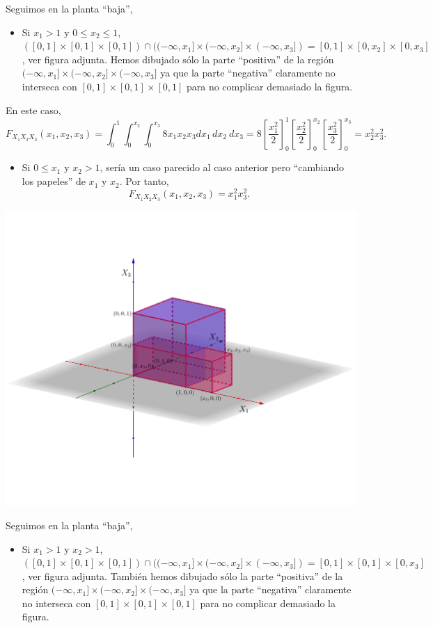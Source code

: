 \documentclass[]{book}
\providecommand{\tightlist}{%
  \setlength{\itemsep}{0pt}\setlength{\parskip}{0pt}}
\begin{document}
Seguimos en la planta ``baja'',

\begin{itemize}
\tightlist
\item
  Si \(x_1 >1\) y \(0\leq x_2\leq 1\), \(([0,1]\times [0,1]\times [0,1])\cap ((-\infty,x_1]\times (-\infty,x_2]\times (-\infty,x_3])=[0,1]\times [0,x_2]\times [0,x_3]\), ver figura adjunta. Hemos dibujado sólo la parte ``positiva'' de la región \((-\infty,x_1]\times (-\infty,x_2]\times (-\infty,x_3]\) ya que la parte ``negativa'' claramente no interseca con \([0,1]\times [0,1]\times [0,1]\) para no complicar demasiado la figura.
\end{itemize}

En este caso,
\[
F_{X_1X_2X_3}(x_1,x_2,x_3)=\int_{0}^{1}\int_{0}^{x_2}\int_{0}^{x_3} 8 x_1 x_2 x_3 dx_1\, dx_2\ dx_3 = 
8\left[\frac{x_1^2}{2}\right]_0^{1}\left[\frac{x_2^2}{2}\right]_0^{x_2}\left[\frac{x_3^2}{2}\right]_0^{x_3} = x_2^2 x_3^2.
\]

\begin{itemize}
\tightlist
\item
  Si \(0\leq x_1\) y \(x_2>1\), sería un caso parecido al caso anterior pero ``cambiando los papeles'' de \(x_1\) y \(x_2\).
  Por tanto,
  \[
  F_{X_1X_2X_3}(x_1,x_2,x_3)=x_1^2 x_3^2.
  \]
\end{itemize}

\includegraphics{Images/Fx1x2x3bajosx1.png}

Seguimos en la planta ``baja'',

\begin{itemize}
\tightlist
\item
  Si \(x_1>1\) y \(x_2>1\), \(([0,1]\times [0,1]\times [0,1])\cap ((-\infty,x_1]\times (-\infty,x_2]\times (-\infty,x_3])=[0,1]\times [0,1]\times [0,x_3]\), ver figura adjunta. También hemos dibujado sólo la parte ``positiva'' de la región \((-\infty,x_1]\times (-\infty,x_2]\times (-\infty,x_3]\) ya que la parte ``negativa'' claramente no interseca con \([0,1]\times [0,1]\times [0,1]\) para no complicar demasiado la figura.
\end{itemize}
\end{document}
